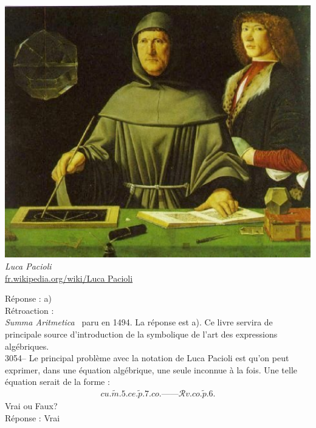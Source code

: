 \documentclass[letterpaper, 12pt]{article}
\begin{document}
\begin{center}
\includegraphics[scale=0.25]{Pacioli.eps}\\
\emph{{\small Luca Pacioli}}\\
\href{http://fr.wikipedia.org/wiki/Luca Pacioli}{fr.wikipedia.org/wiki/Luca Pacioli}\\
\end{center}

R\'eponse : a)\\

R\'etroaction :\\
\og \emph{Summa Aritmetica} \fg \ paru en 1494. La r\'eponse est a). Ce livre servira de principale source d'introduction de la symbolique de l'art des expressions alg\'ebriques.\\



3054-- Le principal probl\`eme avec la notation de Luca Pacioli est qu'on peut exprimer, dans une \'equation alg\'ebrique, une seule inconnue \`a la fois. Une telle \'equation serait de la forme :\\
\begin{eqnarray*}
cu.\tilde{m}.5.ce.\tilde{p}.7.co.\textrm{------}\mathcal{R}v.co.\tilde{p}.6.
\end{eqnarray*}
Vrai ou Faux?\\

R\'eponse : Vrai\\
\end{document}
